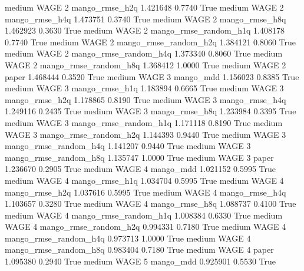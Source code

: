     medium     WAGE                 2        mango_rmse_h2q   1.421648      0.7740    True
    medium     WAGE                 2        mango_rmse_h4q   1.473751      0.3740    True
    medium     WAGE                 2        mango_rmse_h8q   1.462923      0.3630    True
    medium     WAGE                 2 mango_rmse_random_h1q   1.408178      0.7740    True
    medium     WAGE                 2 mango_rmse_random_h2q   1.384121      0.8060    True
    medium     WAGE                 2 mango_rmse_random_h4q   1.373340      0.8060    True
    medium     WAGE                 2 mango_rmse_random_h8q   1.368412      1.0000    True
    medium     WAGE                 2                 paper   1.468444      0.3520    True
    medium     WAGE                 3             mango_mdd   1.156023      0.8385    True
    medium     WAGE                 3        mango_rmse_h1q   1.183894      0.6665    True
    medium     WAGE                 3        mango_rmse_h2q   1.178865      0.8190    True
    medium     WAGE                 3        mango_rmse_h4q   1.249116      0.2435    True
    medium     WAGE                 3        mango_rmse_h8q   1.233984      0.3395    True
    medium     WAGE                 3 mango_rmse_random_h1q   1.171118      0.8190    True
    medium     WAGE                 3 mango_rmse_random_h2q   1.144393      0.9440    True
    medium     WAGE                 3 mango_rmse_random_h4q   1.141207      0.9440    True
    medium     WAGE                 3 mango_rmse_random_h8q   1.135747      1.0000    True
    medium     WAGE                 3                 paper   1.236670      0.2905    True
    medium     WAGE                 4             mango_mdd   1.021152      0.5995    True
    medium     WAGE                 4        mango_rmse_h1q   1.034704      0.5995    True
    medium     WAGE                 4        mango_rmse_h2q   1.037616      0.5995    True
    medium     WAGE                 4        mango_rmse_h4q   1.103657      0.3280    True
    medium     WAGE                 4        mango_rmse_h8q   1.088737      0.4100    True
    medium     WAGE                 4 mango_rmse_random_h1q   1.008384      0.6330    True
    medium     WAGE                 4 mango_rmse_random_h2q   0.994331      0.7180    True
    medium     WAGE                 4 mango_rmse_random_h4q   0.973713      1.0000    True
    medium     WAGE                 4 mango_rmse_random_h8q   0.983404      0.7180    True
    medium     WAGE                 4                 paper   1.095380      0.2940    True
    medium     WAGE                 5             mango_mdd   0.925901      0.5530    True
